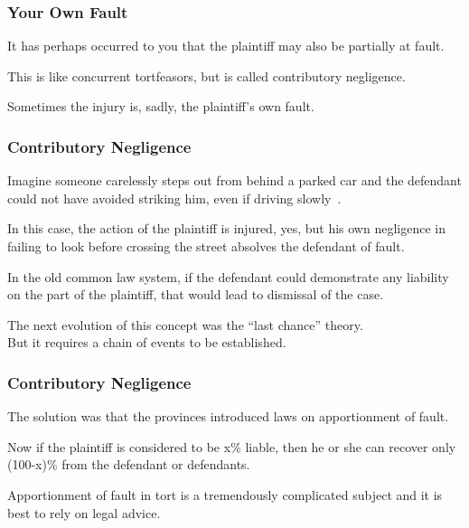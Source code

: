 \begin{frame}
\frametitle{Your Own Fault}

It has perhaps occurred to you that the plaintiff may also be partially at fault.

This is like concurrent tortfeasors, but is called \alert{contributory negligence}.

Sometimes the injury is, sadly, the plaintiff's own fault.

\end{frame}



\begin{frame}
\frametitle{Contributory Negligence}

Imagine someone carelessly steps out from behind a parked car and the defendant could not have avoided striking him, even if driving slowly~\cite{lba}.

In this case, the action of the plaintiff is injured, yes, but his own negligence in failing to look before crossing the street absolves the defendant of fault.

In the old common law system, if the defendant could demonstrate any liability on the part of the plaintiff, that would lead to dismissal of the case.

The next evolution of this concept was the ``last chance'' theory.\\
\quad But it requires a chain of events to be established.

\end{frame}



\begin{frame}
\frametitle{Contributory Negligence}

The solution was that the provinces introduced laws on apportionment of fault.

Now if the plaintiff is considered to be x\% liable, then he or she can recover only (100-x)\% from the defendant or defendants.

Apportionment of fault in tort is a tremendously complicated subject and it is best to rely on legal advice. 

\end{frame}





